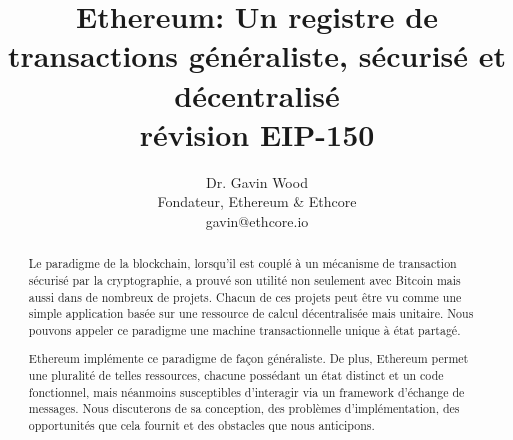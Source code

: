 \documentclass[9pt,oneside]{amsart}
\title{Ethereum: Un registre de transactions généraliste, sécurisé et décentralisé\\ {\smaller \textbf{révision EIP-150}}}
\author{
    Dr. Gavin Wood\\
    Fondateur, Ethereum \& Ethcore\\
    gavin@ethcore.io
}
\begin{document}
\pagecolor{lightyellow}

\begin{abstract}
Le paradigme de la blockchain, lorsqu'il est couplé à un mécanisme de transaction sécurisé par la cryptographie, a prouvé son utilité non seulement avec Bitcoin mais aussi dans de nombreux de projets. Chacun de ces projets peut être vu comme une simple application basée sur une ressource de calcul décentralisée mais unitaire. Nous pouvons appeler ce paradigme une machine transactionnelle unique à état partagé.

Ethereum implémente ce paradigme de façon généraliste. De plus, Ethereum permet une pluralité de telles ressources, chacune possédant un état distinct et un code fonctionnel, mais néanmoins susceptibles d'interagir via un framework d'échange de messages. Nous discuterons de sa conception, des problèmes d'implémentation, des opportunités que cela fournit et des obstacles que nous anticipons.
\end{abstract}

\maketitle
\end{document}

